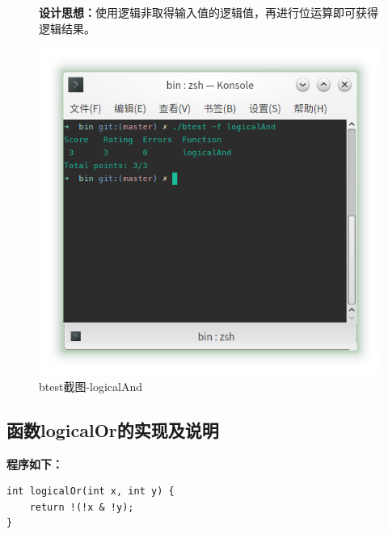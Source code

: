 \begin{figure}[H]
\begin{minipage}[c]{0.5\linewidth}
\textbf{设计思想：}使用逻辑非取得输入值的逻辑值，再进行位运算即可获得逻辑结果。
        
\end{minipage}
\begin{minipage}[c]{0.4\linewidth}
\centering
\includegraphics[width=0.9\linewidth]{figures/logicalAnd}
\caption{btest截图-logicalAnd}
\label{fig:logicalAnd}
\end{minipage}
\end{figure}

\subsection{函数logicalOr的实现及说明}
\textbf{程序如下：}

\begin{verbatim}
int logicalOr(int x, int y) {
    return !(!x & !y);
}
\end{verbatim}


